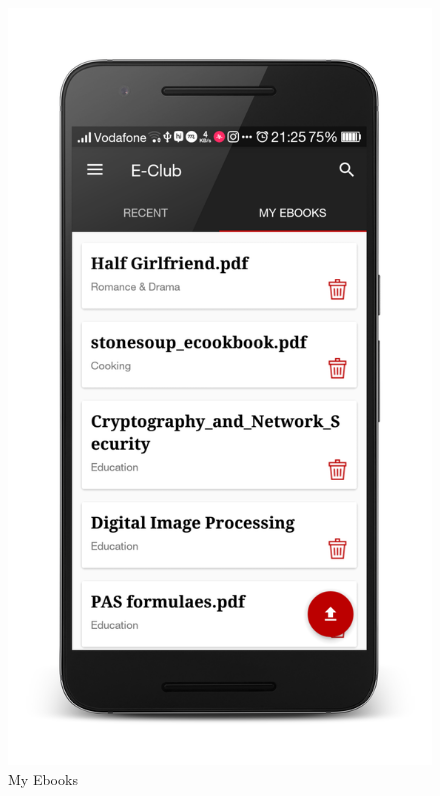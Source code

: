 \begin{figure}[ht]
\centering
\includegraphics[scale=0.13]{images/d12.png}
\caption{My Ebooks}
\end{figure}

\newpage


